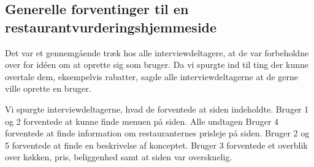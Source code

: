 \documentclass[a4paper, 12pt]{article}
\begin{document}


\subsection{Generelle forventinger til en restaurantvurderingshjemmeside}

Det var et gennemgående træk hos alle interviewdeltagere, at de var forbeholdne
over for idéen om at oprette sig som bruger. Da vi spurgte ind til ting der
kunne overtale dem, eksempelvis rabatter, sagde alle interviewdeltagerne at de
gerne ville oprette en bruger.

Vi spurgte interviewdeltagerne, hvad de forventede at siden indeholdte. Bruger 1
og 2 forventede at kunne finde menuen på siden. Alle undtagen Bruger 4
forventede at finde information om restauranternes prisleje på siden. Bruger 2
og 5 forventede at finde en beskrivelse af konceptet. Bruger 3 forventede et
overblik over køkken, pris, beliggenhed samt at siden var overskuelig.


\end{document}
